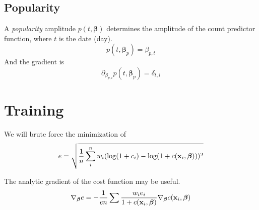 \documentclass{article}
\newcommand{\bx}{{\bf x}}
\newcommand{\bbeta}{\boldsymbol\beta}
\begin{document}
\subsection*{Popularity}

A {\it popularity} amplitude $p(t, \bbeta)$ determines the amplitude
of the
count predictor function, where $t$ is the date (day).
\[
p(t, \bbeta_p) = \beta_{p,t}
\]
And the gradient is
\[
\partial_{\beta_{p,i}} p(t, \bbeta_p) = \delta_{t,i}
\]





\section*{Training}

We will brute force the minimization of
\[
e = \sqrt{\frac{1}{n} \sum_i^n w_i (\log (1 + c_i) - \log(1 + c(\bx_i,
\bbeta)))^2}
\]

The analytic gradient of the cost function may be useful.
\[
\nabla_{\bbeta} e = - \frac{1}{e n} \sum \frac{w_i e_i}{1 + c(\bx_i,
\bbeta)} \nabla_{\bbeta} c(\bx_i, \bbeta)
\]
\end{document}
